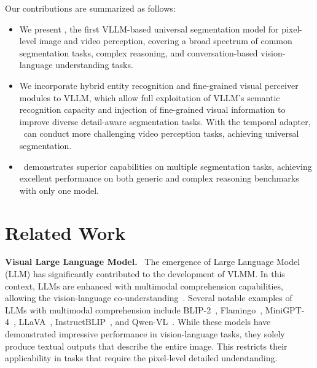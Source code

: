 Our contributions are summarized as follows: 
\begin{itemize}[leftmargin=0.5cm]
    \item We present \name, the first VLLM-based universal segmentation model for pixel-level image and video perception, covering a broad spectrum of common segmentation tasks, complex reasoning, and conversation-based vision-language understanding tasks.
    \item We incorporate hybrid entity recognition and fine-grained visual perceiver modules 
    to VLLM, which allow full exploitation of VLLM’s semantic recognition capacity and injection of fine-grained visual information to improve diverse detail-aware segmentation tasks.
    With the temporal adapter, \name~can conduct more challenging video perception tasks, achieving universal segmentation.
    \item \name~demonstrates superior capabilities on multiple segmentation tasks, achieving excellent performance on both generic and complex reasoning benchmarks with only one model.
    
\end{itemize}

\section{Related Work}
\textbf{Visual Large Language Model.}~
The emergence of Large Language Model (LLM) has significantly contributed to the development of VLMM. In this context, LLMs are enhanced with multimodal comprehension capabilities, allowing the vision-language co-understanding~\cite{li2023blip, alayrac2022flamingo, zhu2023minigpt, liu2024visual, liu2023improved, bai2023qwen}. 
Several notable examples of LLMs with multimodal comprehension include BLIP-2~\cite{li2023blip}, Flamingo~\cite{alayrac2022flamingo}, MiniGPT-4~\cite{zhu2023minigpt}, LLaVA~\cite{liu2024visual}, InstructBLIP~\cite{instructblip}, and Qwen-VL~\cite{bai2023qwen}. While these models have demonstrated impressive performance in vision-language tasks, they solely produce textual outputs that describe the entire image. This restricts their applicability in tasks that require the pixel-level detailed understanding.

